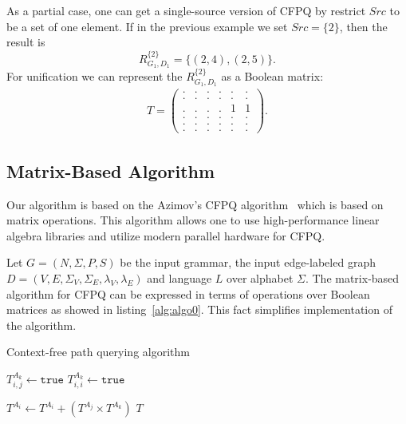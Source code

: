 As a partial case, one can get a single-source version of CFPQ by restrict $Src$ to be a set of one element. 
If in the previous example we set $Src=\{2\}$, then the result is $$R_{G_1, D_1}^{\{2\}} = \{(2, 4), (2, 5)\}.$$ 
For unification we can represent the $R_{G_1, D_1}^{\{2\}}$ as a Boolean matrix:
{
    \renewcommand{\arraystretch}{0.7}
    \setlength\arraycolsep{2pt}
\begin{align*}
T =
\begin{pmatrix}
    . & . & . & . & . & . \\
    . & . & . & . & . & . \\
    . & . & . & . & 1 & 1 \\
    . & . & . & . & . & . \\ 
    . & . & . & . & . & . \\ 
    . & . & . & . & . & .
\end{pmatrix}.
\end{align*}
}

\subsection{Matrix-Based Algorithm}
Our algorithm is based on the Azimov's CFPQ algorithm~\cite{Azimov:2018:CPQ:3210259.3210264} which is based on matrix operations.
This algorithm allows one to use high-performance linear algebra libraries and utilize modern parallel hardware for CFPQ.

Let $G = (N, \Sigma, P, S)$ be the input grammar, the input edge-labeled graph $D = (V, E, \Sigma_V, \Sigma_E, \lambda_V, \lambda_E)$ and language $L$ over alphabet $\Sigma$.
The matrix-based algorithm for CFPQ can be expressed in terms of operations over Boolean matrices as showed in listing~\ref{alg:algo0}. 
This fact simplifies implementation of the algorithm.

{
\begin{algorithm}
\begin{algorithmic}[1]
\caption{Context-free path querying algorithm}
\label{alg:algo0}
          {$T^{A_k}_{i,j} \gets \texttt{true}$}
    \EndFor
            {$T^{A_k}_{i,i} \gets \texttt{true}$}
        \EndFor
    \EndFor

          { $T^{A_i} \gets T^{A_i} + (T^{A_j} \times T^{A_k})$ } 
        \EndFor
    \EndWhile
\State \Return $T$
\EndFunction
\end{algorithmic}
\end{algorithm}
}

